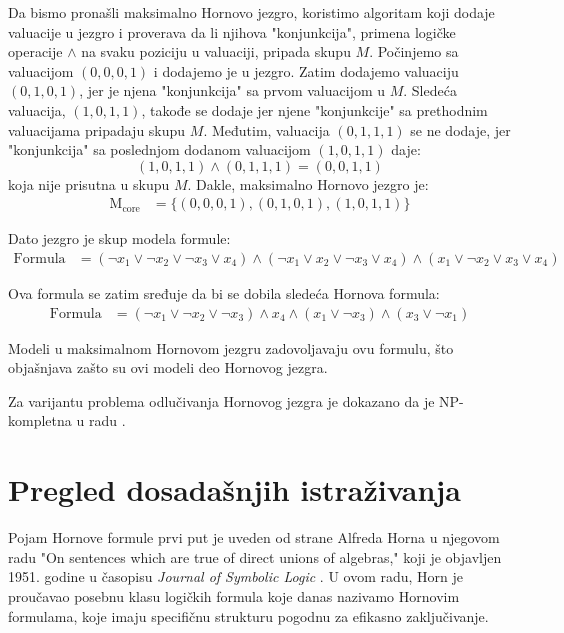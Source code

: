 \documentclass[12pt,oneside]{memoir}
\begin{document}
Da bismo pronašli maksimalno Hornovo jezgro, koristimo algoritam koji dodaje valuacije u jezgro i proverava da li njihova "konjunkcija", primena logičke operacije $\land$ na svaku poziciju u valuaciji, pripada skupu \(M\). Počinjemo sa valuacijom \((0, 0, 0, 1)\) i dodajemo je u jezgro. Zatim dodajemo valuaciju \((0, 1, 0, 1)\), jer je njena "konjunkcija" sa prvom valuacijom u \(M\). Sledeća valuacija, \((1, 0, 1, 1)\), takođe se dodaje jer njene "konjunkcije" sa prethodnim valuacijama pripadaju skupu \(M\). Međutim, valuacija \((0, 1, 1, 1)\) se ne dodaje, jer "konjunkcija" sa poslednjom dodanom valuacijom \((1, 0, 1, 1)\) daje:
\[
(1, 0, 1, 1) \land (0, 1, 1, 1) = (0, 0, 1, 1)
\] koja nije prisutna u skupu \(M\). Dakle, maksimalno Hornovo jezgro je:
\begin{align*}
\text{M}_{\text{core}} &= \{ (0, 0, 0, 1), (0, 1, 0, 1), (1, 0, 1, 1) \}
\end{align*}

Dato jezgro je skup modela formule:
\begin{align*}
\text{Formula} &= (\neg x_1 \lor \neg x_2 \lor \neg x_3 \lor x_4) \land (\neg x_1 \lor  x_2 \lor \neg x_3 \lor x_4) \land (x_1 \lor \neg x_2 \lor x_3 \lor x_4)
\end{align*}

Ova formula se zatim sređuje da bi se dobila sledeća Hornova formula:
\begin{align*}
\text{Formula} &= (\neg x_1 \lor \neg x_2 \lor \neg x_3) \land x_4 \land (x_1 \lor \neg x_3) \land (x_3 \lor \neg x_1)
\end{align*}

Modeli u maksimalnom Hornovom jezgru zadovoljavaju ovu formulu, što objašnjava zašto su ovi modeli deo Hornovog jezgra.

Za varijantu problema odlučivanja Hornovog jezgra je dokazano da je NP-kompletna u radu \cite{doc3}.

\section{Pregled dosadašnjih istraživanja}

Pojam Hornove formule prvi put je uveden od strane Alfreda Horna u njegovom radu "On sentences which are true of direct unions of algebras," koji je objavljen 1951. godine u časopisu \textit{Journal of Symbolic Logic} \cite{doc_horn_clause}. U ovom radu, Horn je proučavao posebnu klasu logičkih formula koje danas nazivamo Hornovim formulama, koje imaju specifičnu strukturu pogodnu za efikasno zaključivanje.
\end{document}
